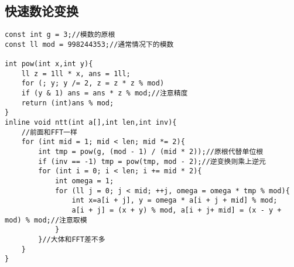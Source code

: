 \subsection{快速数论变换}
\begin{lstlisting}
const int g = 3;//模数的原根
const ll mod = 998244353;//通常情况下的模数

int pow(int x,int y){
	ll z = 1ll * x, ans = 1ll;
    for (; y; y /= 2, z = z * z % mod)
    if (y & 1) ans = ans * z % mod;//注意精度
	return (int)ans % mod;
}
inline void ntt(int a[],int len,int inv){
	//前面和FFT一样
	for (int mid = 1; mid < len; mid *= 2){
		int tmp = pow(g, (mod - 1) / (mid * 2));//原根代替单位根
		if (inv == -1) tmp = pow(tmp, mod - 2);//逆变换则乘上逆元
		for (int i = 0; i < len; i += mid * 2){
			int omega = 1;
			for (ll j = 0; j < mid; ++j, omega = omega * tmp % mod){
				int x=a[i + j], y = omega * a[i + j + mid] % mod;
				a[i + j] = (x + y) % mod, a[i + j+ mid] = (x - y + mod) % mod;//注意取模
			}
		}//大体和FFT差不多
	}
}
\end{lstlisting}

